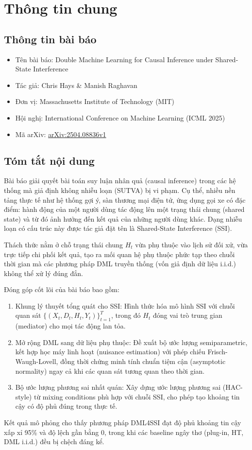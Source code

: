\section{Thông tin chung}

\subsection{Thông tin bài báo}

\begin{itemize}
    \item Tên bài báo: Double Machine Learning for Causal Inference under Shared-State Interference
    \item Tác giả: Chris Hays \& Manish Raghavan
    \item Đơn vị: Massachusetts Institute of Technology (MIT)
    \item Hội nghị: International Conference on Machine Learning (ICML 2025)
    \item Mã arXiv: \href{https://arxiv.org/abs/2504.08836}{arXiv:2504.08836v1}
\end{itemize}

\subsection{Tóm tắt nội dung}

Bài báo giải quyết bài toán suy luận nhân quả (causal inference) trong các hệ thống mà giả định không nhiễu loạn (SUTVA) bị vi phạm. Cụ thể, nhiều nền tảng thực tế như hệ thống gợi ý, sàn thương mại điện tử, ứng dụng gọi xe có đặc điểm: hành động của một người dùng tác động lên một trạng thái chung (shared state) và từ đó ảnh hưởng đến kết quả của những người dùng khác. Dạng nhiễu loạn có cấu trúc này được tác giả đặt tên là Shared-State Interference (SSI).

Thách thức nằm ở chỗ trạng thái chung $H_t$ vừa phụ thuộc vào lịch sử đối xử, vừa trực tiếp chi phối kết quả, tạo ra mối quan hệ phụ thuộc phức tạp theo chuỗi thời gian mà các phương pháp DML truyền thống (vốn giả định dữ liệu i.i.d.) không thể xử lý đúng đắn.

Đóng góp cốt lõi của bài báo bao gồm:

\begin{enumerate}
    \item Khung lý thuyết tổng quát cho SSI: Hình thức hóa mô hình SSI với chuỗi quan sát $\{(X_t, D_t, H_t, Y_t)\}_{t=1}^{T}$, trong đó $H_t$ đóng vai trò trung gian (mediator) cho mọi tác động lan tỏa.

    \item Mở rộng DML sang dữ liệu phụ thuộc: Đề xuất bộ ước lượng semiparametric, kết hợp học máy linh hoạt (nuisance estimation) với phép chiếu Frisch-Waugh-Lovell, đồng thời chứng minh tính chuẩn tiệm cận (asymptotic normality) ngay cả khi các quan sát tương quan theo thời gian.

    \item Bộ ước lượng phương sai nhất quán: Xây dựng ước lượng phương sai (HAC-style) từ mixing conditions phù hợp với chuỗi SSI, cho phép tạo khoảng tin cậy có độ phủ đúng trong thực tế.
\end{enumerate}

Kết quả mô phỏng cho thấy phương pháp DML4SSI đạt độ phủ khoảng tin cậy xấp xỉ 95\% và độ lệch gần bằng 0, trong khi các baseline ngây thơ (plug-in, HT, DML i.i.d.) đều bị chệch đáng kể.
